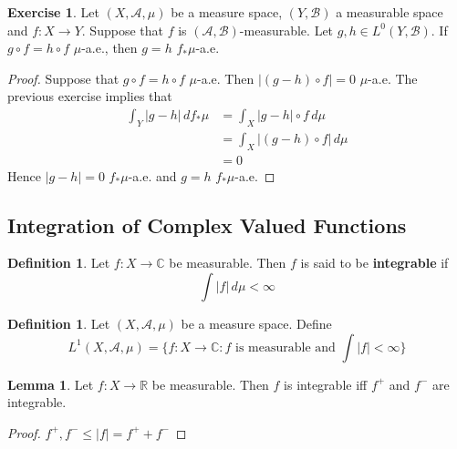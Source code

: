 \documentclass[12pt]{amsart}
\theoremstyle{definition}
\newtheorem{defn}[definition]{Definition}
\newtheorem{lem}[definition]{Lemma}
\newtheorem{ex}[definition]{Exercise}
\newcommand{\C}{\mathbb{C}}
\newcommand{\R}{\mathbb{R}}
\newcommand{\MA}{\mathcal{A}}
\newcommand{\MB}{\mathcal{B}}
\newcommand{\dmu}{\, d \mu}
\newcommand{\ld}[1]{\label{defn:#1}}
\begin{document}
	\begin{ex}
		Let $(X, \MA, \mu)$ be a measure space, $(Y, \MB)$ a measurable space and $f: X \rightarrow Y$. Suppose that $f$ is $(\MA, \MB)$-measurable. Let $g, h \in L^0(Y, \MB)$. If $g \circ f = h \circ f$ $\mu$-a.e., then $g = h$ $f_*\mu$-a.e.
	\end{ex}

	\begin{proof}
		Suppose that $g \circ f = h \circ f$ $\mu$-a.e. Then $|(g - h) \circ f| = 0$ $\mu$-a.e. The previous exercise implies that 
		\begin{align*}
			\int_Y |g - h|  \, d f_*\mu 
			& = \int_X |g - h| \circ f \dmu \\
			& = \int_X |(g - h) \circ f| \dmu \\
			& = 0
		\end{align*}
		Hence $|g - h| = 0$ $f_*\mu$-a.e. and $g = h$ $f_*\mu$-a.e.
	\end{proof}

	
	
	
	
	
	
	
	
	
	
	
	
	
	
	
	
	\newpage
	\subsection{Integration of Complex Valued Functions}
	
	\begin{defn} \ld{00000} 
		Let $f:X \rightarrow \C$ be measurable. Then $f$ is said to be \textbf{integrable} if $$\int |f| \dmu < \infty$$
	\end{defn}
	
	\begin{defn} \ld{00000} 
		Let $(X, \MA, \mu)$ be a measure space. Define $$L^1(X, \MA, \mu) = \bigg \{f:X \rightarrow \C : f \text{ is measurable and } \int |f| < \infty \bigg \}$$
	\end{defn}
	
	\begin{lem}
		Let $f:X \rightarrow \R$ be measurable. Then $f$ is integrable iff $f^+$ and $f^-$ are integrable. 
	\end{lem}
	
	\begin{proof}
		$f^+,f^- \leq |f| = f^+ + f^-$
	\end{proof}
	
\end{document}
